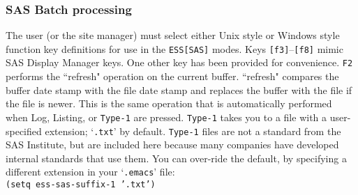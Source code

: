 \documentclass{article}
\newcommand{\stexttt}[1]{{\small\texttt{#1}}}
\newcommand{\file}[1]{`\stexttt{#1}'}
\begin{document}
\subsubsection{SAS Batch processing}
\label{sec:SAS:proc:batch}

The user (or the site manager) must select either Unix style or
Windows style function key definitions for use in the
\stexttt{ESS[SAS]} modes.
Keys \stexttt{[f3]}--\stexttt{[f8]} mimic SAS Display Manager keys.
One other key has been provided for convenience.  \stexttt{F2}
performs the ``refresh" operation on the current buffer.  ``refresh"
compares the buffer date stamp with the file date stamp and replaces
the buffer with the file if the file is newer.  This is the same
operation that is automatically performed when Log, Listing, or
\stexttt{Type-1} are pressed.  \stexttt{Type-1} takes you to a file
with a user-specified extension; \file{.txt} by default.
\stexttt{Type-1} files are not a standard from the SAS Institute, but
are included here because many companies have developed internal
standards that use them.  You can over-ride the default, by specifying
a different extension in your \file{.emacs} file:\\
\stexttt{(setq ess-sas-suffix-1 '.txt')}
\end{document}
